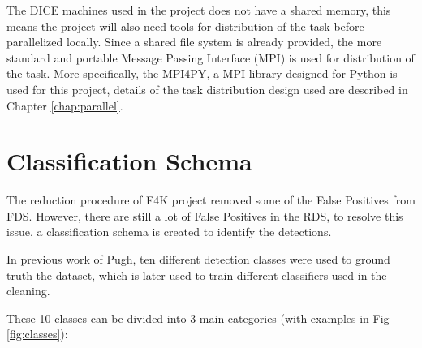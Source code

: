 \documentclass[bsc,logo,twoside,fullspacing,parskip]{infthesis}
\begin{document}
The DICE machines used in the project does not have a shared memory, this means the project will also need tools for distribution of the task before parallelized locally.
Since a shared file system is already provided, the more standard and portable Message Passing Interface (MPI) is used for distribution of the task. More specifically, the MPI4PY\cite{MPI4PY}, a MPI library designed for Python is used for this project, details of the task distribution design used are described in Chapter \ref{chap:parallel}.

\section{Classification Schema}
\label{sec:schema}

The reduction procedure of F4K project removed some of the False Positives from FDS. 
However, there are still a lot of False Positives in the RDS, to resolve this issue, a classification schema is created to identify the detections.

In previous work of Pugh\cite{Pugh}, ten different detection classes were used to ground truth the dataset, which is later used to train different classifiers used in the cleaning. 

These 10 classes can be divided into 3 main categories (with examples in Fig \ref{fig:classes}):

\renewcommand{\labelenumi}{\bfseries\Roman{enumi}}
\renewcommand{\labelenumii}{\bfseries\arabic{enumii}}
\renewcommand{\labelenumiii}{\bfseries\roman{enumiii}}
\end{document}
